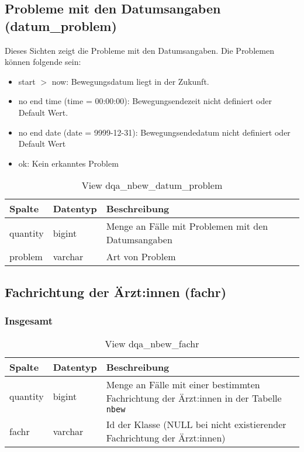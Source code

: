 \subsection{Probleme mit den Datumsangaben (datum\_problem)} \label{subsec:bewFalDat}

Dieses Sichten zeigt die Probleme mit den Datumsangaben. Die Problemen können folgende sein:

\begin{itemize}
	\item start $>$ now: Bewegungsdatum liegt in der Zukunft.
	\item no end time (time = 00:00:00): Bewegungsendezeit nicht definiert oder Default Wert.
	\item no end date (date = 9999-12-31): Bewegungsendedatum nicht definiert oder Default Wert
	\item ok: Kein erkanntes Problem
\end{itemize}
                          
\begin{table}[ht]
	\centering   
	\caption{View dqa\_nbew\_datum\_problem}
	\label{tab:bewFalDatI}
	\begin{tabular}{||l|l|p{10cm}||}   		
		\hline
		Spalte & Datentyp & Beschreibung \\ [0.5ex]
		\hline\hline
		quantity & bigint & Menge an Fälle mit Problemen mit den Datumsangaben \\
		\hline
		problem & varchar & Art von Problem \\
		\hline		
	\end{tabular}
\end{table}

\subsection{Fachrichtung der Ärzt:innen (fachr)} \label{subsec:bewFachr}

\subsubsection{Insgesamt} \label{subsubsec:bewFachrI}

\begin{table}[ht]
	\centering   
	\caption{View dqa\_nbew\_fachr}
	\label{tab:bewFachrI}
	\begin{tabular}{||l|l|p{10cm}||}   		
		\hline
		Spalte & Datentyp & Beschreibung \\ [0.5ex]
		\hline\hline
		quantity & bigint & Menge an Fälle mit einer bestimmten Fachrichtung der Ärzt:innen in der Tabelle \texttt{nbew} \\
		\hline
		fachr & varchar & Id der Klasse (NULL bei nicht existierender Fachrichtung der Ärzt:innen)\\
		\hline
		
	\end{tabular}
\end{table}

